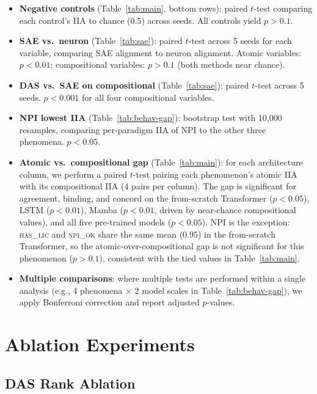 \documentclass[11pt]{article}
\begin{document}
\begin{itemize}[itemsep=3pt,leftmargin=*]
    \item \textbf{Negative controls} (Table~\ref{tab:main}, bottom rows): paired $t$-test comparing each control's IIA to chance (0.5) across seeds. All controls yield $p > 0.1$.
    \item \textbf{SAE vs.\ neuron} (Table~\ref{tab:sae}): paired $t$-test across 5 seeds for each variable, comparing SAE alignment to neuron alignment. Atomic variables: $p < 0.01$; compositional variables: $p > 0.1$ (both methods near chance).
    \item \textbf{DAS vs.\ SAE on compositional} (Table~\ref{tab:sae}): paired $t$-test across 5 seeds. $p < 0.001$ for all four compositional variables.
    \item \textbf{NPI lowest IIA} (Table~\ref{tab:behav-gap}): bootstrap test with 10{,}000 resamples, comparing per-paradigm IIA of NPI to the other three phenomena. $p < 0.05$.
    \item \textbf{Atomic vs.\ compositional gap} (Table~\ref{tab:main}): for each architecture column, we perform a paired $t$-test pairing each phenomenon's atomic IIA with its compositional IIA (4 pairs per column).
    The gap is significant for agreement, binding, and concord on the from-scratch Transformer ($p < 0.05$), LSTM ($p < 0.01$), Mamba ($p < 0.01$, driven by near-chance compositional values), and all five pre-trained models ($p < 0.05$).
    NPI is the exception: \textsc{has\_lic} and \textsc{npi\_ok} share the same mean ($0.95$) in the from-scratch Transformer, so the atomic-over-compositional gap is not significant for this phenomenon ($p > 0.1$), consistent with the tied values in Table~\ref{tab:main}.
    \item \textbf{Multiple comparisons}: where multiple tests are performed within a single analysis (e.g., 4 phenomena $\times$ 2 model scales in Table~\ref{tab:behav-gap}), we apply Bonferroni correction and report adjusted $p$-values.
\end{itemize}

\section{Ablation Experiments}
\label{app:ablation}

\subsection{DAS Rank Ablation}
\label{app:rank}
\end{document}
